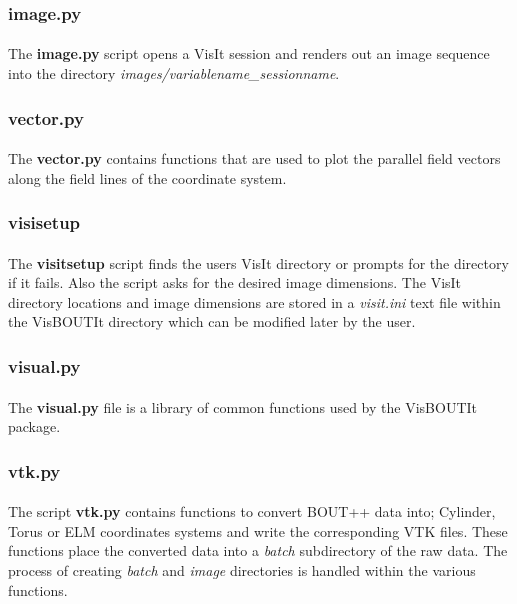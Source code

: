 \documentclass[12pt,a4paper]{article}
\begin{document}
	\subsubsection{image.py}
	\paragraph{}
	The \textbf{image.py} script opens a VisIt session and renders out an image sequence into the directory \textit{images/variablename\_sessionname}.
	
	\subsubsection{vector.py}
	\paragraph{}
	The \textbf{vector.py} contains functions that are used to plot the parallel field vectors along the field lines of the coordinate system.
	
	\subsubsection{visisetup}
	\paragraph{}
	The \textbf{visitsetup} script finds the users VisIt directory or prompts for the directory if it fails. Also the script asks for the desired image dimensions. The VisIt directory locations and image dimensions are stored in a \textit{visit.ini} text file within the VisBOUTIt directory which can be modified later by the user.
	
	\subsubsection{visual.py}
	\paragraph{}
	The \textbf{visual.py} file is a library of common functions used by the VisBOUTIt package. 
	
	\subsubsection{vtk.py}
	\paragraph{}
	The script \textbf{vtk.py} contains functions to convert BOUT++ data into; Cylinder, Torus or ELM coordinates systems and write the corresponding VTK files. These functions place the converted data into a \textit{batch} subdirectory of the raw data. The process of creating \textit{batch} and \textit{image} directories is handled within the various functions.
\end{document}
